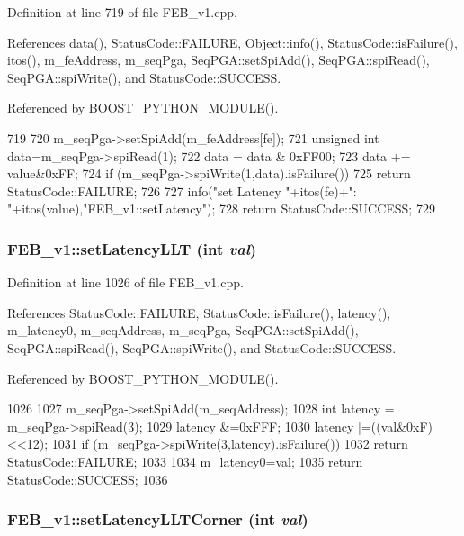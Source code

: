 Definition at line 719 of file FEB\_\-v1.cpp.

References data(), StatusCode::FAILURE, Object::info(), StatusCode::isFailure(), itos(), m\_\-feAddress, m\_\-seqPga, SeqPGA::setSpiAdd(), SeqPGA::spiRead(), SeqPGA::spiWrite(), and StatusCode::SUCCESS.

Referenced by BOOST\_\-PYTHON\_\-MODULE().


\begin{DoxyCode}
719                                                 {
720   m_seqPga->setSpiAdd(m_feAddress[fe]);
721   unsigned int data=m_seqPga->spiRead(1);
722   data = data & 0xFF00;
723   data += value&0xFF;
724   if (m_seqPga->spiWrite(1,data).isFailure()){
725     return StatusCode::FAILURE;
726   }
727   info("set Latency "+itos(fe)+": "+itos(value),"FEB_v1::setLatency");
728   return StatusCode::SUCCESS;
729 }
\end{DoxyCode}
\hypertarget{classFEB__v1_abf7b8a0e6842ecf74a2b1889fbb9a722}{
\subsubsection[{setLatencyLLT}]{ FEB\_\-v1::setLatencyLLT (int {\em val})}}
\label{classFEB__v1_abf7b8a0e6842ecf74a2b1889fbb9a722}


Definition at line 1026 of file FEB\_\-v1.cpp.

References StatusCode::FAILURE, StatusCode::isFailure(), latency(), m\_\-latency0, m\_\-seqAddress, m\_\-seqPga, SeqPGA::setSpiAdd(), SeqPGA::spiRead(), SeqPGA::spiWrite(), and StatusCode::SUCCESS.

Referenced by BOOST\_\-PYTHON\_\-MODULE().


\begin{DoxyCode}
1026                                        {
1027   m_seqPga->setSpiAdd(m_seqAddress);
1028   int latency = m_seqPga->spiRead(3);
1029   latency &=0xFFF;
1030   latency |=((val&0xF)<<12);
1031    if (m_seqPga->spiWrite(3,latency).isFailure()){
1032     return StatusCode::FAILURE;
1033   }
1034    m_latency0=val;
1035   return StatusCode::SUCCESS;   
1036 }
\end{DoxyCode}
\hypertarget{classFEB__v1_a935e78031961cff9330e82a70bf91052}{
\subsubsection[{setLatencyLLTCorner}]{ FEB\_\-v1::setLatencyLLTCorner (int {\em val})}}
\label{classFEB__v1_a935e78031961cff9330e82a70bf91052}


